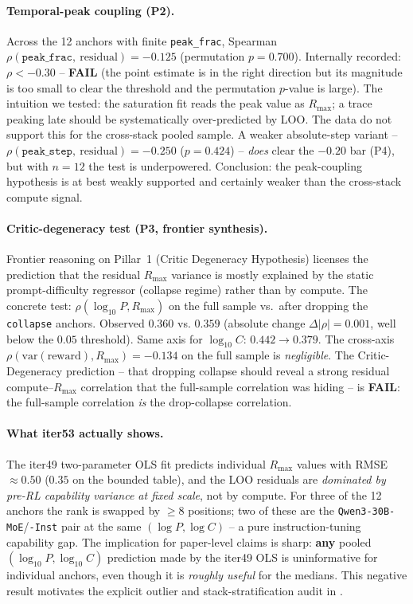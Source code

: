 \paragraph{Temporal-peak coupling (P2).}
\label{par:peak-coupling}
Across the 12 anchors with finite \texttt{peak\_frac}, Spearman
$\rho(\texttt{peak\_frac},\ \mathrm{residual})=-0.125$ (permutation $p=0.700$).
Internally recorded: $\rho < -0.30$ -- \textbf{FAIL} (the point estimate is in
the right direction but its magnitude is too small to clear the threshold
and the permutation $p$-value is large). The intuition we tested: the
saturation fit reads the peak value as $R_{\max}$; a trace peaking late
should be systematically over-predicted by LOO. The data do not support
this for the cross-stack pooled sample. A weaker absolute-step variant
-- $\rho(\texttt{peak\_step},\ \mathrm{residual})=-0.250$ ($p=0.424$) --
\emph{does} clear the $-0.20$ bar (P4), but with $n=12$ the test is
underpowered. Conclusion: the peak-coupling hypothesis is at best weakly
supported and certainly weaker than the cross-stack compute signal.

\paragraph{Critic-degeneracy test (P3, frontier synthesis).}
Frontier reasoning on Pillar~1 (Critic Degeneracy Hypothesis) licenses
the prediction that the residual $R_{\max}$ variance is mostly explained
by the static prompt-difficulty regressor (collapse regime) rather than
by compute. The concrete test: $\rho(\log_{10} P, R_{\max})$ on the full
sample vs.\ after dropping the \texttt{collapse} anchors. Observed
$0.360$ vs. $0.359$ (absolute change $\Delta|\rho|=0.001$, well below the
$0.05$ threshold). Same axis for $\log_{10} C$: $0.442 \to 0.379$. The
cross-axis $\rho(\mathrm{var}(\mathrm{reward}), R_{\max})=-0.134$ on the full
sample is \emph{negligible}. The Critic-Degeneracy prediction -- that
dropping collapse should reveal a strong residual compute--$R_{\max}$
correlation that the full-sample correlation was hiding -- is
\textbf{FAIL}: the full-sample correlation \emph{is} the drop-collapse
correlation.

\paragraph{What iter53 actually shows.}
The iter49 two-parameter OLS fit predicts individual $R_{\max}$ values with
RMSE $\approx 0.50$ ($0.35$ on the bounded table), and the LOO residuals are
\emph{dominated by pre-RL capability variance at fixed scale}, not by compute. For three of
the 12 anchors the rank is swapped by $\geq 8$ positions; two of these are
the \texttt{Qwen3-30B-MoE}/\texttt{-Inst} pair at the same $(\log P, \log C)$ -- a pure
instruction-tuning capability gap. The implication for paper-level claims is sharp:
\textbf{any} pooled $(\log_{10} P, \log_{10} C)$ prediction made by the iter49 OLS is
uninformative for individual anchors, even though it is
\emph{roughly useful} for the medians. This negative result motivates the
explicit outlier and stack-stratification audit in .
